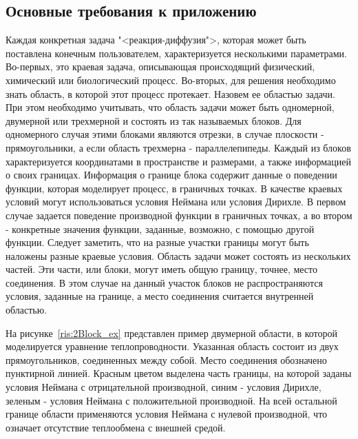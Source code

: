 \documentclass[a4paper, 14pt]{extarticle}
\theoremstyle{definition}
\begin{document}
\subsection{Основные требования к приложению}

\par Каждая конкретная задача "<реакция-диффузия">, которая может быть поставлена конечным пользователем, характеризуется несколькими параметрами. Во-первых, это краевая задача, описывающая происходящий физический, химический или биологический процесс. Во-вторых, для решения необходимо знать область, в которой этот процесс протекает. Назовем ее областью задачи. При этом необходимо учитывать, что область задачи может быть одномерной, двумерной или трехмерной и состоять из так называемых блоков. Для одномерного случая этими блоками являются отрезки, в случае плоскости - прямоугольники, а если область трехмерна - параллелепипеды. Каждый из блоков характеризуется координатами в пространстве и размерами, а также информацией о своих границах. Информация о границе блока содержит данные о поведении функции, которая моделирует процесс, в граничных точках. В качестве краевых условий могут использоваться условия Неймана или условия Дирихле. В первом случае задается поведение производной функции в граничных точках, а во втором - конкретные значения функции, заданные, возможно, с помощью другой функции. Следует заметить, что на разные участки границы могут быть наложены разные краевые условия. Область задачи может состоять из нескольких частей. Эти части, или блоки, могут иметь общую границу, точнее, место соединения. В этом случае на данный участок блоков не распространяются условия, заданные на границе, а место соединения считается внутренней областью.

\par На рисунке~\ref{ris:2Block_ex} представлен пример двумерной области, в которой моделируется уравнение теплопроводности. Указанная область состоит из двух прямоугольников, соединенных между собой. Место соединения обозначено пунктирной линией. Красным цветом выделена часть границы, на которой заданы условия Неймана с отрицательной производной, синим - условия Дирихле, зеленым - условия Неймана с положительной производной. На всей остальной границе области применяются условия Неймана с нулевой производной, что означает отсутствие теплообмена с внешней средой.
\end{document}
